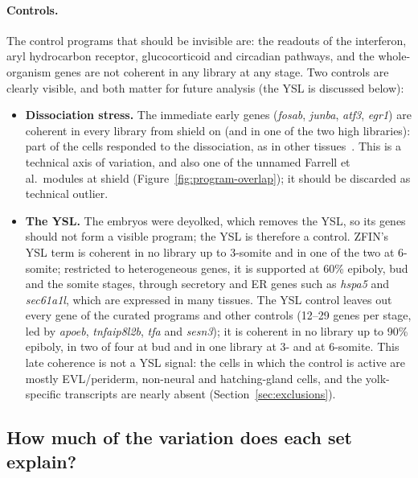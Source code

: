 \documentclass[11pt,a4paper]{article}
\begin{document}
\paragraph{Controls.} The control programs that should be invisible are: the readouts of the interferon, aryl hydrocarbon receptor, glucocorticoid and circadian pathways, and the whole-organism genes are not coherent in any library at any stage. Two controls are clearly visible, and both matter for future analysis (the YSL is discussed below):
\begin{itemize}
	\item \textbf{Dissociation stress.} The immediate early genes (\emph{fosab}, \emph{junba}, \emph{atf3}, \emph{egr1}) are coherent in every library from shield on (and in one of the two high libraries): part of the cells responded to the dissociation, as in other tissues~\cite{vandenbrink2017}. This is a technical axis of variation, and also one of the unnamed Farrell et al.\ modules at shield (Figure~\ref{fig:program-overlap}); it should be discarded as technical outlier.
	\item \textbf{The YSL.} The embryos were deyolked, which removes the YSL, so its genes should not form a visible program; the YSL is therefore a control. ZFIN's YSL term is coherent in no library up to 3-somite and in one of the two at 6-somite; restricted to heterogeneous genes, it is supported at 60\% epiboly, bud and the somite stages, through secretory and ER genes such as \emph{hspa5} and \emph{sec61a1l}, which are expressed in many tissues. The YSL control leaves out every gene of the curated programs and other controls (12--29 genes per stage, led by \emph{apoeb}, \emph{tnfaip8l2b}, \emph{tfa} and \emph{sesn3}); it is coherent in no library up to 90\% epiboly, in two of four at bud and in one library at 3- and at 6-somite. This late coherence is not a YSL signal: the cells in which the control is active are mostly EVL/periderm, non-neural and hatching-gland cells, and the yolk-specific transcripts are nearly absent (Section~\ref{sec:exclusions}).
\end{itemize}

\subsection{How much of the variation does each set explain?}
\label{sec:program-prediction}
\end{document}
